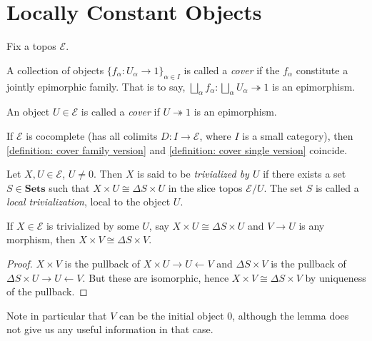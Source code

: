 %
%

\chapter{Locally Constant Objects}

Fix a topos $\mathscr{E}$.

\begin{definition}
\label{definition: cover family version}
A collection of objects $\{f_{\alpha} : U_\alpha \to 1\}_{\alpha \in I}$ is called a \emph{cover} if the $f_\alpha$ constitute a jointly epimorphic family. That is to say, $\bigsqcup_{\alpha} f_{\alpha} : \bigsqcup_{\alpha} U_{\alpha} \twoheadrightarrow 1$ is an epimorphism.
\end{definition}

\begin{definition}
\label{definition: cover single version}
An object $U \in \mathscr{E}$ is called a \emph{cover} if $U \twoheadrightarrow 1$ is an epimorphism.
\end{definition}

If $\mathscr{E}$ is cocomplete (has all colimits $D : I \to \mathscr{E}$, where $I$ is a small category), then \cref{definition: cover family version} and \cref{definition: cover single version} coincide.

\begin{definition}
Let $X,U \in \mathscr{E}$, $U \neq 0$. Then $X$ is said to be \emph{trivialized by $U$} if there exists a set $S \in \mathbf{Sets}$ such that $X \times U \cong \Delta S \times U$ in the slice topos $\mathscr{E}/U$. The set $S$ is called a \emph{local trivialization}, local to the object $U$.
\end{definition}

\begin{lemma}
If $X \in \mathscr{E}$ is trivialized by some $U$, say $X \times U \cong \Delta S \times U$ and $V \to U$ is any morphism, then $X \times V \cong \Delta S \times V$.
\end{lemma}
\begin{proof}
$X \times V$ is the pullback of $X \times U \to U \leftarrow V$ and $\Delta S \times V$ is the pullback of $\Delta S \times U \to U \leftarrow V$. But these are isomorphic, hence $X \times V \cong \Delta S \times V$ by uniqueness of the pullback.
\end{proof}

Note in particular that $V$ can be the initial object $0$, although the lemma does not give us any useful information in that case.

